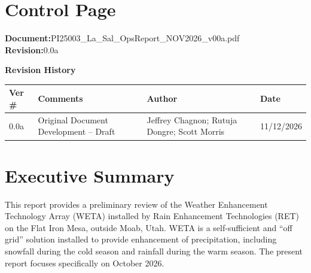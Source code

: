 \documentclass[11pt]{article}
\begin{document}


\setcounter{page}{1}
\pagestyle{fancy}

\tableofcontents
\clearpage

\section{Control Page}

\textbf{Document:}\hspace{0.8em}PI25003\_La\_Sal\_OpsReport\_NOV2026\_v00a.pdf\\
\textbf{Revision:}\hspace{0.98em}0.0a

\vspace{7pt}

\textbf{Revision History}

\renewcommand{\arraystretch}{1.3}
\setlength{\arrayrulewidth}{0.8pt}

\begin{table}[h!]
\centering
\renewcommand{\arraystretch}{1.2}

\begin{tabular}{|p{1.2cm}|p{7.2cm}|p{4.1cm}|p{2.0cm}|}
\hline
\rowcolor{headerbg}
\textbf{Ver \#} & \textbf{Comments} & \textbf{Author} & \textbf{Date} \\
\hline
0.0a & Original Document Development -- Draft &
Jeffrey Chagnon; Rutuja Dongre; Scott Morris & 11/12/2026 \\
\hline
\end{tabular}
\end{table}

\clearpage

\section{Executive Summary}

This report provides a preliminary review of the Weather Enhancement Technology Array (WETA)
installed by Rain Enhancement Technologies (RET) on the Flat Iron Mesa, outside Moab, Utah.
WETA is a self-sufficient and ``off grid'' solution installed to provide enhancement of precipitation,
including snowfall during the cold season and rainfall during the warm season. The present report focuses specifically
on October 2026.
\end{document}
